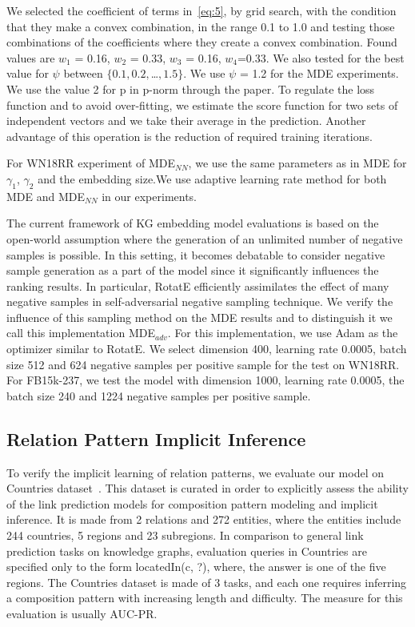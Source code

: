 \documentclass{ecai}
\begin{document}
We selected the coefficient of terms in~\eqref{eq:5}, by grid search, with the condition that they make a convex combination, in the range 0.1 to 1.0 and testing those combinations of the coefficients where they create a convex combination. Found values are $w_1$ = 0.16, $w_2$ = 0.33, $w_3$ = 0.16, $w_4$=0.33. We also tested for the best value for $\psi$ between $\{0.1, 0.2, $\dots$, 1.5\}$. We use $\psi$ = 1.2 for the MDE experiments. We use the value 2 for p in p-norm through the paper. To regulate the loss function and to avoid over-fitting, we estimate the score function for two sets of independent vectors and we take their average in the prediction. Another advantage of this operation is the reduction of required training iterations. 

For WN18RR experiment of MDE$_{NN}$, we use the same parameters as in MDE for $\gamma_1$, $\gamma_2$ and the embedding size.We use adaptive learning rate method for both MDE and MDE$_{NN}$ in our experiments. 

The current framework of KG embedding model evaluations is based on the open-world assumption where the generation of an unlimited number of negative samples is possible. In this setting, it becomes debatable to consider negative sample generation as a part of the model since it significantly influences the ranking results.
In particular, RotatE efficiently assimilates the effect of many negative samples in self-adversarial negative sampling technique.
We verify the influence of this sampling method on the MDE results and to distinguish it we call this implementation MDE$_{adv}$. For this implementation, we use Adam as the optimizer similar to RotatE. We select dimension 400, learning rate 0.0005, batch size 512 and 624 negative samples per positive sample for the test on WN18RR. For FB15k-237, we test the model with dimension 1000, learning rate 0.0005, the batch size 240 and 1224 negative samples per positive sample.

\subsection{Relation Pattern Implicit Inference}
To verify the implicit learning of relation patterns, we evaluate our model on Countries dataset~\cite{bouchard2015approximate,nickel2016holographic}. This dataset is curated in order to explicitly assess the ability of the link prediction models for composition pattern modeling and implicit inference. It is made from 2 relations and 272 entities, where the entities include 244 countries, 5 regions and 23 subregions. In comparison to general link prediction tasks on knowledge graphs, evaluation queries in Countries are specified only to the form locatedIn(c, ?), where, the answer is one of the five regions. The Countries dataset is made of 3 tasks, and each one requires inferring a composition pattern with increasing length and difficulty. The measure for this evaluation is usually AUC-PR.
\end{document}
